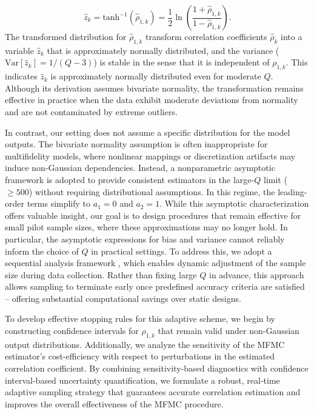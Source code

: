 %
\begin{equation}
\label{eq:Fisher_z}
    \widehat z_k  = \text{tanh}^{-1}\left(\widehat\rho_{1,k}\right) = \frac 1 2\ln \left(\frac{1+\widehat\rho_{1,k}}{1-\widehat\rho_{1,k}}\right).
\end{equation}
%
The transformed distribution for $\widehat \rho_{1,k}$ transform correlation coefficients $\widehat \rho_k$ into a variable $\widehat z_k$ that is approximately normally distributed, and the variance ($\text{Var}[\widehat z_k] = 1/(Q - 3)$) is stable in the sense that it is independent of $\rho_{1,k}$. This indicates $\widehat z_k$ is approximately normally distributed even for moderate $Q$. Although its derivation assumes bivariate normality, the transformation remains effective in practice when the data exhibit moderate deviations from normality and are not contaminated by extreme outliers. 

In contrast, our setting does not assume a specific distribution for the model outputs. The bivariate normality assumption is often inappropriate for multifidelity models, where nonlinear mappings or discretization artifacts may induce non-Gaussian dependencies. Instead, a nonparametric asymptotic framework \cite{Og:2006, Pi:1937} is adopted to provide consistent estimators in the large-$Q$ limit ($\ge 500$) without requiring distributional assumptions. In this regime, the leading-order terms simplify to $a_1 = 0$ and $a_2 = 1$. While this asymptotic characterization offers valuable insight, our goal is to design procedures that remain effective for small pilot sample sizes, where these approximations may no longer hold. In particular, the asymptotic expressions for bias and variance cannot reliably inform the choice of $Q$ in practical settings. To address this, we adopt a sequential analysis framework \cite{La:2001,Wa:1947}, which enables dynamic adjustment of the sample size during data collection. Rather than fixing large $Q$ in advance, this approach allows sampling to terminate early once predefined accuracy criteria are satisfied -- offering substantial computational savings over static designs. 


To develop effective stopping rules for this adaptive scheme, we begin by constructing confidence intervals for $\rho_{1,k}$ that remain valid under non-Gaussian output distributions. Additionally, we analyze the sensitivity of the MFMC estimator’s cost-efficiency with respect to perturbations in the estimated correlation coefficient. By combining sensitivity-based diagnostics with confidence interval-based uncertainty quantification, we formulate a robust, real-time adaptive sampling strategy that guarantees accurate correlation estimation and improves the overall effectiveness of the MFMC procedure.

